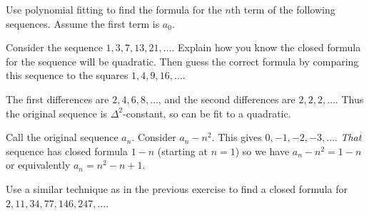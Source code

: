 \begin{questions}



\question Use polynomial fitting to find the formula for the $n$th term of the following sequences.  Assume the first term is $a_0$.

	\begin{answer}
	\end{answer}



\question Consider the sequence $ 1, 3, 7, 13, 21, \ldots$.  Explain how you know the closed formula for the sequence will be quadratic.  Then guess the correct formula by comparing this sequence to the squares $1, 4, 9, 16, \ldots$.

	\begin{answer}
		The first differences are $2, 4, 6, 8, \ldots$, and the second differences are $2, 2, 2, \ldots$.  Thus the original sequence is $\Delta^2$-constant, so can be fit to a quadratic.
		
		Call the original sequence $a_n$.  Consider $a_n - n^2$. This gives $0, -1, -2, -3, \ldots$.  \emph{That} sequence has closed formula $1-n$ (starting at $n = 1$) so we have $a_n - n^2 = 1-n$ or equivalently $a_n = n^2 - n + 1$.
	\end{answer}


\question Use a similar technique as in the previous exercise to find a closed formula for $2, 11, 34, 77, 146, 247,\ldots$.


\end{questions}

